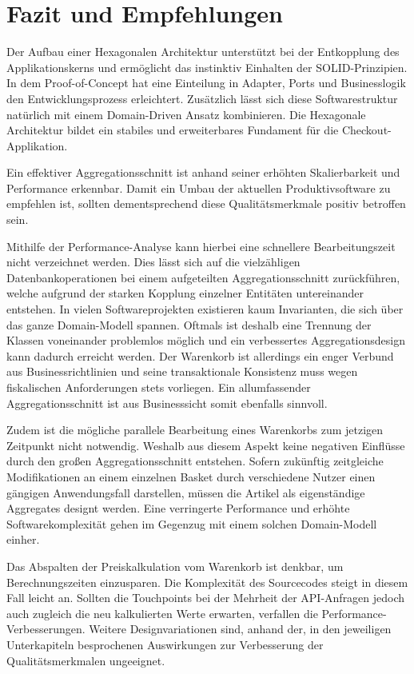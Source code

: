 

\chapter{Fazit und Empfehlungen}

Der Aufbau einer Hexagonalen Architektur unterstützt bei der Entkopplung des Applikationskerns und ermöglicht das instinktiv Einhalten der SOLID-Prinzipien. In dem Proof-of-Concept hat eine Einteilung in Adapter, Ports und Businesslogik den Entwicklungsprozess erleichtert. Zusätzlich lässt sich diese Softwarestruktur natürlich mit einem Domain-Driven Ansatz kombinieren. Die Hexagonale Architektur bildet ein stabiles und erweiterbares Fundament für die Checkout-Applikation.

Ein effektiver Aggregationsschnitt ist anhand seiner erhöhten Skalierbarkeit und Performance erkennbar. Damit ein Umbau der aktuellen Produktivsoftware zu empfehlen ist, sollten dementsprechend diese Qualitätsmerkmale positiv betroffen sein. 

Mithilfe der Performance-Analyse kann hierbei eine schnellere Bearbeitungszeit nicht verzeichnet werden. Dies lässt sich auf die vielzähligen Datenbankoperationen bei einem aufgeteilten Aggregationsschnitt zurückführen, welche aufgrund der starken Kopplung einzelner Entitäten untereinander entstehen. In vielen Softwareprojekten existieren kaum Invarianten, die sich über das ganze Domain-Modell spannen. Oftmals ist deshalb eine Trennung der Klassen voneinander problemlos möglich und ein verbessertes Aggregationsdesign kann dadurch erreicht werden. Der Warenkorb ist allerdings ein enger Verbund aus Businessrichtlinien und seine transaktionale Konsistenz muss wegen fiskalischen Anforderungen stets vorliegen. Ein allumfassender Aggregationsschnitt ist aus Businesssicht somit ebenfalls sinnvoll.

Zudem ist die mögliche parallele Bearbeitung eines Warenkorbs zum jetzigen Zeitpunkt nicht notwendig. Weshalb aus diesem Aspekt keine negativen Einflüsse durch den großen Aggregationsschnitt entstehen. Sofern zukünftig zeitgleiche Modifikationen an einem einzelnen Basket durch verschiedene Nutzer einen gängigen Anwendungsfall darstellen, müssen die Artikel als eigenständige Aggregates designt werden. Eine verringerte Performance und erhöhte Softwarekomplexität gehen im Gegenzug mit einem solchen Domain-Modell einher.

Das Abspalten der Preiskalkulation vom Warenkorb ist denkbar, um Berechnungszeiten einzusparen. Die Komplexität des Sourcecodes steigt in diesem Fall leicht an. Sollten die Touchpoints bei der Mehrheit der API-Anfragen jedoch auch zugleich die neu kalkulierten Werte erwarten, verfallen die Performance-Verbesserungen. Weitere Designvariationen sind, anhand der, in den jeweiligen Unterkapiteln besprochenen Auswirkungen zur Verbesserung der Qualitätsmerkmalen ungeeignet.

